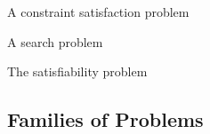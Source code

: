 \begin{example}
A constraint satisfaction problem

\end{example}

\begin{example}
A search problem
\end{example}

\begin{example}
The satisfiability problem

\end{example}

\subsection{Families of Problems}

%
